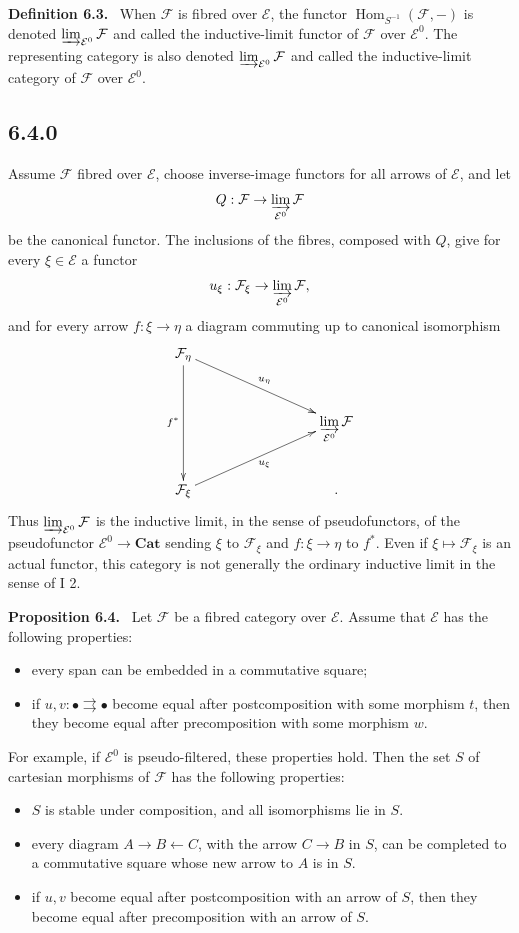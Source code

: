 \documentclass[11pt]{article}
\newcommand{\E}{\mathcal{E}}
\newcommand{\F}{\mathcal{F}}
\newcommand{\Cat}{\mathbf{Cat}}
\newcommand{\Hom}{\operatorname{Hom}}
\newcommand{\bigdot}{\bullet}
\newenvironment{statement}[1]{\par\medskip\noindent\textbf{#1.}\ }{\par\medskip}
\begin{document}
\begin{statement}{Definition 6.3}
When \(\F\) is fibred over \(\E\), the functor \(\Hom_{S^{-1}}(\F,-)\) is denoted \(\varinjlim_{\E^0}\F\) and called the inductive-limit functor of \(\F\) over \(\E^0\). The representing category is also denoted \(\varinjlim_{\E^0}\F\) and called the inductive-limit category of \(\F\) over \(\E^0\).
\end{statement}

\subsection*{6.4.0}
Assume \(\F\) fibred over \(\E\), choose inverse-image functors for all arrows of \(\E\), and let
\[
 Q:\F\to\varinjlim_{\E^0}\F
\]
be the canonical functor. The inclusions of the fibres, composed with \(Q\), give for every \(\xi\in\E\) a functor
\[
 u_\xi:\F_\xi\to\varinjlim_{\E^0}\F,
\]
and for every arrow \(f:\xi\to\eta\) a diagram commuting up to canonical isomorphism
\[
\xymatrix@R=1cm@C=3cm{
\F_\eta\ar[rd]^{u_\eta}\ar[dd]_{f^*}&\\
&\displaystyle\varinjlim_{\E^0}\F\\
\F_\xi\ar[ru]_{u_\xi}&.
}
\]
Thus \(\varinjlim_{\E^0}\F\) is the inductive limit, in the sense of pseudofunctors, of the pseudofunctor \(\E^0\to\Cat\) sending \(\xi\) to \(\F_\xi\) and \(f:\xi\to\eta\) to \(f^*\). Even if \(\xi\mapsto\F_\xi\) is an actual functor, this category is not generally the ordinary inductive limit in the sense of I 2.

\begin{statement}{Proposition 6.4}
Let \(\F\) be a fibred category over \(\E\). Assume that \(\E\) has the following properties:
\begin{itemize}
\item[L1)] every span can be embedded in a commutative square;
\item[L2)] if \(u,v:\bigdot\rightrightarrows\bigdot\) become equal after postcomposition with some morphism \(t\), then they become equal after precomposition with some morphism \(w\).
\end{itemize}
For example, if \(\E^0\) is pseudo-filtered, these properties hold. Then the set \(S\) of cartesian morphisms of \(\F\) has the following properties:
\begin{itemize}
\item[Fr1)] \(S\) is stable under composition, and all isomorphisms lie in \(S\).
\item[Fr2)] every diagram \(A\to B\leftarrow C\), with the arrow \(C\to B\) in \(S\), can be completed to a commutative square whose new arrow to \(A\) is in \(S\).
\item[Fr3)] if \(u,v\) become equal after postcomposition with an arrow of \(S\), then they become equal after precomposition with an arrow of \(S\).
\end{itemize}
\end{statement}
\end{document}
